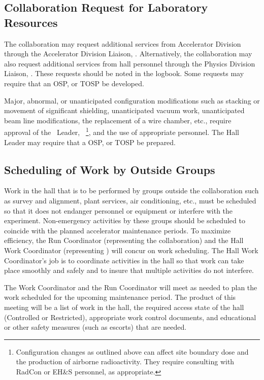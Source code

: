 \documentclass[10pt]{article}
\begin{document}
\subsection{Collaboration Request for Laboratory Resources}

The collaboration may request additional services from Accelerator
Division through the Accelerator Division Liaison, \ACCDIVLIAISON.  Alternatively,
the collaboration may also request additional services from hall personnel
through the Physics Division Liaison, \PHYSDIVLIAISON. These requests
should be noted in the logbook. Some requests may require that an
OSP, or TOSP be developed.

Major, abnormal, or unanticipated configuration modifications such as stacking
or movement of significant shielding, unanticipated vacuum work, unanticipated
beam line modifications, the replacement of a wire chamber, etc., require
approval of the \HALL\ Leader, \HALLLEADER\
\footnote{\label{fn1}Configuration changes as outlined above can affect site
boundary dose and the production of airborne radioactivity. They require
consulting with RadCon or EH\&S personnel, as appropriate.}, and the use of
appropriate personnel. The Hall Leader may require that a OSP, or
TOSP be prepared.

\subsection{Scheduling of Work by Outside Groups }

Work in the hall that is to be performed by groups outside the collaboration
such as survey and alignment, plant services, air conditioning, etc.,
must be scheduled so that it does not
endanger personnel or equipment or interfere with the experiment.
Non-emergency activities by these groups should be
scheduled to coincide with the planned accelerator maintenance periods.
To maximize efficiency, the Run Coordinator (representing the collaboration)
and the Hall Work Coordinator (representing \HALL) will concur
on work scheduling.
The Hall Work Coordinator's job is to
coordinate activities in the hall so that work can take place smoothly
and safely and to insure that multiple activities do not interfere.

The Work Coordinator and the Run
Coordinator will meet as needed to plan the work
scheduled for the upcoming maintenance period.
The product of this meeting will be
a list of work in the hall, the required access state of the
hall (Controlled or Restricted), appropriate work
control documents, and educational or other
safety measures (such as escorts) that are needed.
\end{document}
